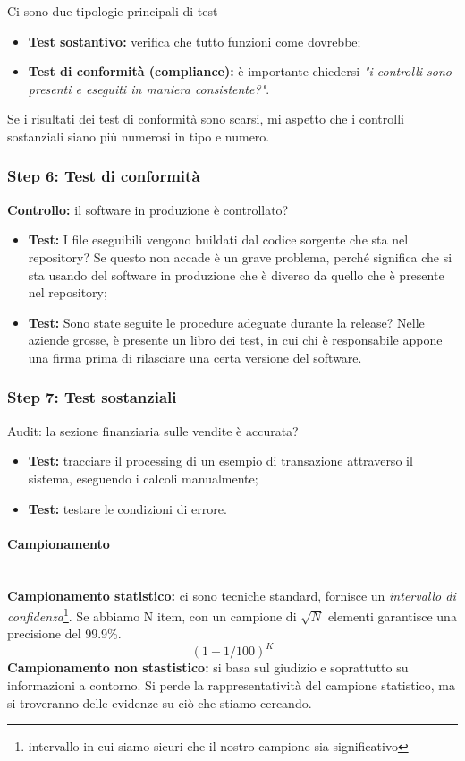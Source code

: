Ci sono due tipologie principali di test
\begin{itemize}
\item \textbf{Test sostantivo:} verifica che tutto funzioni come dovrebbe;
\item \textbf{Test di conformità (compliance):} è importante chiedersi  \textit{
"i controlli sono presenti e eseguiti in maniera consistente?"}.
\end{itemize}

Se i risultati dei test di conformità sono scarsi, mi aspetto che i controlli
sostanziali siano più numerosi in tipo e numero.

\subsubsection{Step 6: Test di conformità}

\textbf{Controllo:} il software in produzione è controllato?
\begin{itemize}
\item \textbf{Test:} I file eseguibili vengono buildati dal codice sorgente che
sta nel repository? Se questo non accade è un grave problema, perché significa
che si sta usando del software in produzione che è diverso da quello che è
presente nel repository;
\item \textbf{Test:} Sono state seguite le procedure adeguate durante la
release? Nelle aziende grosse, è presente un libro dei test, in cui chi è
responsabile appone una firma prima di rilasciare una certa versione del
software.
\end{itemize}


\subsubsection{Step 7: Test sostanziali}

Audit: la sezione finanziaria sulle vendite è accurata?

\begin{itemize}
\item \textbf{Test:} tracciare il processing di un esempio di transazione
attraverso il sistema, eseguendo i calcoli manualmente;
\item \textbf{Test:} testare le condizioni di errore.
\end{itemize}


\paragraph{Campionamento}\mbox{}\\

\textbf{Campionamento statistico:} ci sono tecniche standard, fornisce un
\textit{intervallo di confidenza}\footnote{intervallo in cui siamo sicuri che
il nostro campione sia significativo}. Se abbiamo N item, con un campione di
$\sqrt{N}$ elementi garantisce una precisione del 99.9\%.
$$
(1 - 1/100)^K
$$
\newline
\textbf{Campionamento non stastistico:} si basa sul giudizio e soprattutto su
informazioni a contorno. Si perde la rappresentatività del campione statistico,
ma si troveranno delle evidenze su ciò che stiamo cercando.